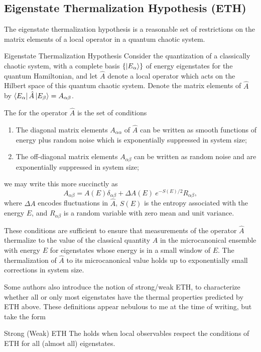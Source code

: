 \subsection{Eigenstate Thermalization Hypothesis (ETH)}
\label{glossary:eth}
The eigenstate thermalization hypothesis is a reasonable set of restrictions on the matrix elements of a local operator in a quantum chaotic system.
\begin{definition}{Eigenstate Thermalization Hypothesis}{}
    Consider the quantization of a classically chaotic system, with a complete basis \(\{\ket{E_\alpha}\}\) of energy eigenstates for the quantum Hamiltonian, and let \(\hat{A}\) denote a local operator which acts on the Hilbert space of this quantum chaotic system.
    Denote the matrix elements of \(\hat{A}\) by \(\bra{E_\alpha}\hat{A}\ket{E_\beta} = A_{\alpha\beta}\).
    
    The  for the operator \(\hat{A}\) is the set of conditions
    \begin{enumerate}
        \item The diagonal matrix elements \(A_{\alpha\alpha}\) of \(\hat{A}\) can be written as smooth functions of energy plus random noise which is exponentially suppressed in system size;
        \item The off-diagonal matrix elements \(A_{\alpha\beta}\) can be written as random noise and are exponentially suppressed in system size;
    \end{enumerate}
    we may write this more succinctly as
    \begin{equation}
        A_{\alpha\beta} = A(E) \delta_{\alpha\beta} + \Delta A(E) ~ e^{-S(E)/2}R_{\alpha\beta},
    \end{equation}
    where \(\Delta A\) encodes fluctuations in \(\hat{A}\), \(S(E)\) is the entropy associated with the energy \(E\), and \(R_{\alpha\beta}\) is a random variable with zero mean and unit variance.
\end{definition}

These conditions are sufficient to ensure that measurements of the operator \(\hat{A}\) thermalize to the value of the classical quantity \(A\) in the microcanonical ensemble with energy \(E\) for eigenstates whose energy is in a small window of \(E\).
%
The thermalization of \(\hat{A}\) to its microcanonical value holds up to exponentially small corrections in system size.

Some authors also introduce the notion of strong/weak ETH, to characterize whether all or only most eigenstates have the thermal properties predicted by ETH above.
%
These definitions appear nebulous to me at the time of writing, but take the form
\begin{definition}{Strong (Weak) ETH}{}
The  holds when local observables respect the conditions of ETH for all (almost all) eigenstates.
\end{definition}


